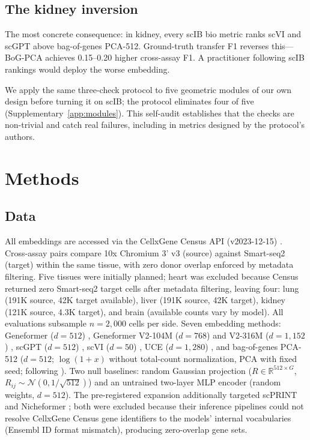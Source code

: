 \documentclass[11pt]{article}
\begin{document}
\subsection{The kidney inversion}
\label{sec:kidney}

The most concrete consequence: in kidney, every scIB bio metric ranks scVI and scGPT above bag-of-genes PCA-512. Ground-truth transfer F1 reverses this---BoG-PCA achieves 0.15--0.20 higher cross-assay F1. A practitioner following scIB rankings would deploy the worse embedding.

We apply the same three-check protocol to five geometric modules of our own design before turning it on scIB; the protocol eliminates four of five (Supplementary~\ref{app:modules}). This self-audit establishes that the checks are non-trivial and catch real failures, including in metrics designed by the protocol's authors.


\section{Methods}

\subsection{Data}

All embeddings are accessed via the CellxGene Census API (v2023-12-15) \citep{abdulla2025cellxgene}. Cross-assay pairs compare 10x Chromium 3' v3 (source) against Smart-seq2 (target) within the same tissue, with zero donor overlap enforced by metadata filtering. Five tissues were initially planned; heart was excluded because Census returned zero Smart-seq2 target cells after metadata filtering, leaving four: lung (191K source, 42K target available), liver (191K source, 42K target), kidney (121K source, 4.3K target), and brain (available counts vary by model). All evaluations subsample $n = 2{,}000$ cells per side. Seven embedding methods: Geneformer ($d = 512$) \citep{theodoris2023geneformer}, Geneformer V2-104M ($d = 768$) and V2-316M ($d = 1{,}152$) \citep{theodoris2023geneformer}, scGPT ($d = 512$) \citep{cui2024scgpt}, scVI ($d = 50$) \citep{lopez2018scvi}, UCE ($d = 1{,}280$) \citep{rosen2026uce}, and bag-of-genes PCA-512 ($d = 512$; $\log(1 + x)$ without total-count normalization, PCA with fixed seed; following \citealp{cole2026morpheus}). Two null baselines: random Gaussian projection ($R \in \mathbb{R}^{512 \times G}$, $R_{ij} \sim \mathcal{N}(0, 1/\sqrt{512})$) and an untrained two-layer MLP encoder (random weights, $d = 512$). The pre-registered expansion additionally targeted scPRINT \citep{llorens2024scprint} and Nicheformer \citep{schaar2024nicheformer}; both were excluded because their inference pipelines could not resolve CellxGene Census gene identifiers to the models' internal vocabularies (Ensembl ID format mismatch), producing zero-overlap gene sets.
\end{document}
